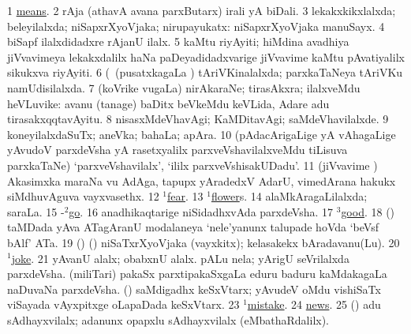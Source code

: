 \noindent
\gl{\pagu}
\bmng
\bnum
\num{1}  \hyperref{kandict_m.pdf}{M}{means pagu(5)}{means}. 
\num{2}  rAja (athavA avana parxButarx) irali yA biDali. 
\num{3}  lekakxkikxlalxda; beleyilalxda; niSapxrXyoVjaka; nirupayukatx:  niSapxrXyoVjaka manuSayx. 
\num{4}  biSapf ilalxdidadxre rAjanU ilalx. 
\num{5}  kaMtu riyAyiti; hiMdina avadhiya jiVvavimeya lekakxdalilx haNa paDeyadidadxvarige jiVvavime kaMtu pAvatiyalilx sikukxva riyAyiti. 
\num{6}  (\saMkiSx\ (pusatxkagaLa \vi) tAriVKinalalxda; parxkaTaNeya tAriVKu namUdisilalxda. 
\num{7} (koVrike \mo vugaLa) nirAkaraNe; tirasAkxra; ilalxveMdu heVLuvike:  avanu (tanage) baDitx beVkeMdu keVLida, Adare adu tirasakxqqtavAyitu. 
\num{8}  nisasxMdeVhavAgi; KaMDitavAgi; saMdeVhavilalxde. 
\num{9}  koneyilalxdaSuTx; aneVka; bahaLa; apAra. 
\num{10} (pAdacArigaLige yA vAhagaLige yAvudoV parxdeVsha yA rasetxyalilx parxveVshavilalxveMdu tiLisuva parxkaTaNe) `parxveVshavilalx', `ililx parxveVshisakUDadu'. 
\num{11} (jiVvavime \vi) Akasimxka maraNa \mo vu AdAga, tapupx yAradedxV AdarU, vimedArana hakukx siMdhuvAguva vayxvasethx. 
\num{12}  \hyperref{kandict_f.pdf}{F}{fear(1) nuga(1)}{$^1$fear}. 
\num{13}  \hyperref{kandict_f.pdf}{F}{flower(1) pagu(3)}{$^1$flower}s. 
\num{14}  alaMkAragaLilalxda; saraLa. 
\num{15}  -\hyperref{kandict_g.pdf}{G}{go(2) pagu(7)}{$^2$go}. 
\num{16}  anadhikaqtarige niSidadhxvAda parxdeVsha. 
\num{17}  \hyperref{kandict_g.pdf}{G}{good(3) nuga(11)}{$^3$good}. 
\num{18} (\ame) taMDada yAva ATagAranU modalaneya `nele'yanunx talupade hoVda `beVsf bAlf' ATa. 
\num{19} (\AseTxrXV) (\ashi) niSaTxrXyoVjaka (vayxkitx); kelasakekx bAradavanu(Lu). 
\num{20}  \hyperref{kandict_j.pdf}{J}{joke(1) pagu(2)}{$^1$joke}. 
\num{21}  yAvanU alalx; obabxnU alalx. 
  
\banum
{} pALu nela; yArigU seVrilalxda parxdeVsha. 
 (miliTari) pakaSx parxtipakaSxgaLa eduru baduru kaMdakagaLa naDuvaNa parxdeVsha. 
 (\rUpa) saMdigadhx keSxVtarx; yAvudeV oMdu vishiSaTx viSayada vAyxpitxge oLapaDada keSxVtarx. 
\eanum
\numie
\num{23}  \hyperref{kandict_m.pdf}{M}{mistake(1) pagu(1)}{$^1$mistake}. 
\num{24}  \hyperref{kandict_n.pdf}{N}{news pagu(4)}{news}. 
\num{25} (\AmA) adu sAdhayxvilalx; adanunx opapxlu sAdhayxvilalx (eMbathaRdalilx). 
